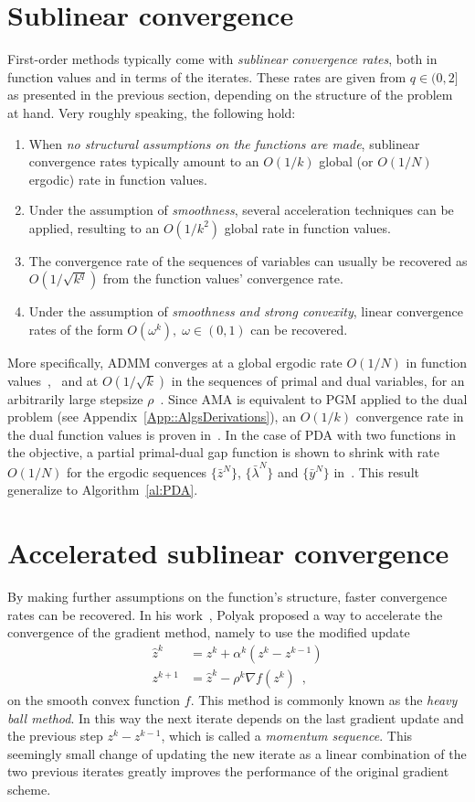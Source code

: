 \documentclass[openany]{now}
\begin{document}
\section{Sublinear convergence}
First-order methods typically come with \emph{sublinear convergence rates}, both in function values and in terms of the iterates. These rates are given from $q\in(0,2]$ as presented in the previous section, depending on the structure of the problem at hand.
Very roughly speaking, the following hold:
\begin{enumerate}
 \item When \emph{no structural assumptions on the functions are made}, sublinear convergence rates typically amount to an $O(1/k)$ global (or $O(1/N)$ ergodic) rate in function values.
 \item Under the assumption of \emph{smoothness}, several acceleration techniques can be applied, resulting to an $O(1/k^2)$ global rate in function values.
 \item The convergence rate of the sequences of variables can usually be recovered as $O(1/\sqrt{k^q})$ from the function values' convergence rate.
 \item Under the assumption of \emph{smoothness and strong convexity}, linear convergence rates of the form $O(\omega^k), \; \omega\in(0,1)$ can be recovered.
\end{enumerate}
More specifically, ADMM converges at a global ergodic rate $O(1/N)$ in function values~\cite{shefi2014rate},~\cite{HeY12} and at $O(1/\sqrt{k})$ in the sequences of primal and dual variables, for an arbitrarily large stepsize $\rho$~\cite{shefi2014rate}.
Since AMA is equivalent to PGM applied to the dual problem (see Appendix~\ref{App::AlgsDerivations}), an $O(1/k)$ convergence rate in the dual function values is proven in~\cite[Theorem~3.1]{fista}.
In the case of PDA with two functions in the objective, a partial primal-dual gap function is shown to shrink with rate $O(1/N)$ for the ergodic sequences $\{\bar{z}^N\}$, $\{\bar{\lambda}^N\}$ and $\{\bar{y}^N\}$ in~\cite{chamb}. This result generalize to Algorithm~\ref{al:PDA}.

\section{Accelerated sublinear convergence}
By making further assumptions on the function's structure, faster convergence rates can be recovered.
In his work~\cite{Polyak19641}, Polyak proposed a way to accelerate the convergence of the gradient method, namely to use the modified update
\begin{align*}%
 \hat{z}^k     &= z^k + \alpha^k(z^k-z^{k-1})\\
 z^{k+1} &= \hat{z}^k - \rho^k\nabla f(z^k)\enspace, 
\end{align*}
on the smooth convex function $f$. This method is commonly known as the \emph{heavy ball method}. In this way the next iterate depends on the last gradient update and the previous step $z^k-z^{k-1}$, which is called a \emph{momentum sequence}. This seemingly small change of updating the new iterate as a linear combination of the two previous iterates greatly improves the performance of the original gradient scheme. 
\end{document}
